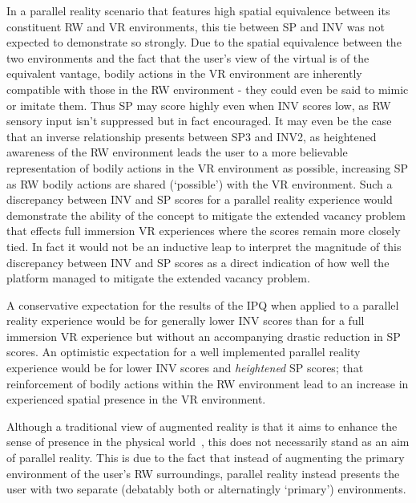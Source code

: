 In a parallel reality scenario that features high spatial equivalence between its constituent RW and VR environments, this tie between SP and INV was not expected to demonstrate so strongly. Due to the spatial equivalence between the two environments and the fact that the user's view of the virtual is of the equivalent vantage, bodily actions in the VR environment are inherently compatible with those in the RW environment - they could even be said to mimic or imitate them. Thus SP may score highly even when INV scores low, as RW sensory input isn't suppressed but in fact encouraged. It may even be the case that an inverse relationship presents between SP3 and INV2, as heightened awareness of the RW environment leads the user to a more believable representation of bodily actions in the VR environment as possible, increasing SP as RW bodily actions are shared (`possible') with the VR environment. Such a discrepancy between INV and SP scores for a parallel reality experience would demonstrate the ability of the concept to mitigate the extended vacancy problem that effects full immersion VR experiences where the scores remain more closely tied. In fact it would not be an inductive leap to interpret the magnitude of this discrepancy between INV and SP scores as a direct indication of how well the platform managed to mitigate the extended vacancy problem.

A conservative expectation for the results of the IPQ when applied to a parallel reality experience would be for generally lower INV scores than for a full immersion VR experience but without an accompanying drastic reduction in SP scores. An optimistic expectation for a well implemented parallel reality experience would be for lower INV scores and \textit{heightened} SP scores; that reinforcement of bodily actions within the RW environment lead to an increase in experienced spatial presence in the VR environment.

Although a traditional view of augmented reality is that it aims to enhance the sense of presence in the physical world~\cite{Waterworth2014}, this does not necessarily stand as an aim of parallel reality. This is due to the fact that instead of augmenting the primary environment of the user's RW surroundings, parallel reality instead presents the user with two separate (debatably both or alternatingly `primary') environments.



